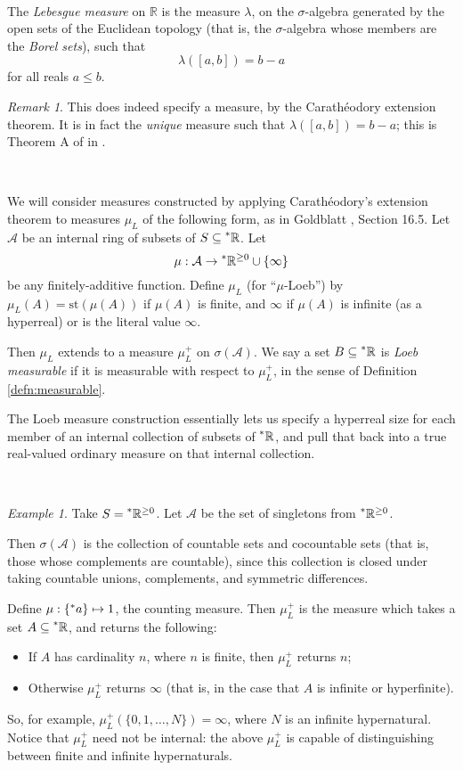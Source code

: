 \documentclass[11pt]{amsart}
\theoremstyle{remark}
\newtheorem*{remark}{Remark}
\newtheorem*{example}{Example}
\newcommand{\st}{\mathrm{st}}
\newcommand{\hyp}[1][\mathbb{R}]{\prescript{*}{}{#1}}
\begin{document}
\

\begin{defn}
The \emph{Lebesgue measure} on $\mathbb{R}$ is the measure $\lambda$, on the $\sigma$-algebra generated by the open sets of the Euclidean topology (that is, the $\sigma$-algebra whose members are the \emph{Borel sets}), such that $$\lambda([a,b]) = b-a$$
for all reals $a \leq b$.\end{defn}
\begin{remark}
This does indeed specify a measure, by the Carath\'eodory extension theorem.
It is in fact the \emph{unique} measure such that $\lambda([a,b]) = b-a$; this is Theorem A of  in \cite{halmos}.
\end{remark}

\

We will consider measures constructed by applying Carath\'eodory's extension theorem to measures $\mu_L$ of the following form, as in Goldblatt \cite{goldblatt}, Section 16.5.
Let $\mathcal{A}$ be an internal ring of subsets of $S \subseteq \hyp$.
Let $$\mu: \mathcal{A} \to \hyp^{\geq 0} \cup \{ \infty \}$$ be any finitely-additive function.
Define $\mu_L$ (for ``$\mu$-Loeb'') by $\mu_L(A) = \st(\mu(A))$ if $\mu(A)$ is finite, and $\infty$ if $\mu(A)$ is infinite (as a hyperreal) or is the literal value $\infty$.

Then $\mu_L$ extends to a measure $\mu_L^+$ on $\sigma(\mathcal{A})$. We say a set $B \subseteq \hyp$ is \emph{Loeb measurable} if it is measurable with respect to $\mu_L^+$, in the sense of Definition \ref{defn:measurable}.

The Loeb measure construction essentially lets us specify a hyperreal size for each member of an internal collection of subsets of $\hyp$, and pull that back into a true real-valued ordinary measure on that internal collection.

\

\begin{example}
Take $S = \hyp^{\geq 0}$.
Let $\mathcal{A}$ be the set of singletons from $\hyp^{\geq 0}$.

Then $\sigma(\mathcal{A})$ is the collection of countable sets and cocountable sets (that is, those whose complements are countable), since this collection is closed under taking countable unions, complements, and symmetric differences.

Define $\mu: \{ \hyp[a] \} \mapsto 1$, the counting measure.
Then $\mu_L^+$ is the measure which takes a set $A \subseteq \hyp$, and returns the following:
\begin{itemize}
\item If $A$ has cardinality $n$, where $n$ is finite, then $\mu_L^+$ returns $n$;
\item Otherwise $\mu_L^+$ returns $\infty$ (that is, in the case that $A$ is infinite or hyperfinite).
\end{itemize}
So, for example, $\mu_L^+(\{ 0, 1, \dots, N \}) = \infty$, where $N$ is an infinite hypernatural.
Notice that $\mu_L^+$ need not be internal: the above $\mu_L^+$ is capable of distinguishing between finite and infinite hypernaturals.
\end{example}
\end{document}
